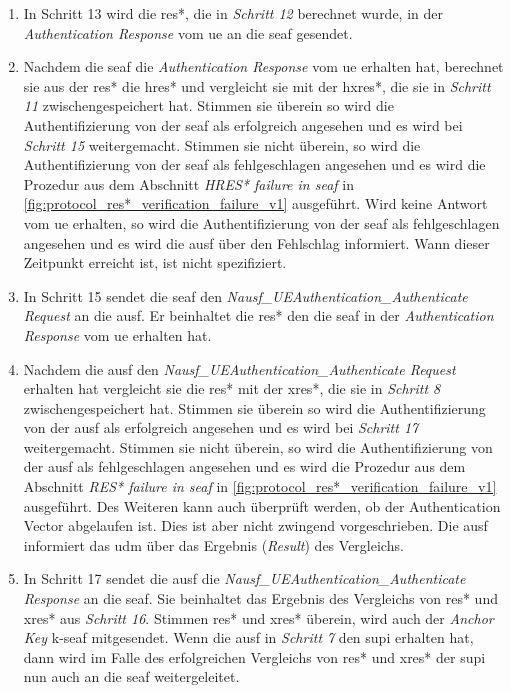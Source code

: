\begin{enumerate}
\item In Schritt 13 wird die \gls{res*}, die in \textit{Schritt 12} berechnet wurde, in der \textit{Authentication Response} vom \gls{ue} an die \gls{seaf} gesendet.

\item Nachdem die \gls{seaf} die \textit{Authentication Response} vom \gls{ue} erhalten hat, berechnet sie aus der \gls{res*} die \gls{hres*} und vergleicht sie mit der \gls{hxres*}, die sie in \textit{Schritt 11} zwischengespeichert hat.
Stimmen sie überein so wird die Authentifizierung von der \gls{seaf} als erfolgreich angesehen und es wird bei \textit{Schritt 15} weitergemacht.
Stimmen sie nicht überein, so wird die Authentifizierung von der \gls{seaf} als fehlgeschlagen angesehen und es wird die Prozedur aus dem Abschnitt \textit{HRES* failure in \gls{seaf}} in \cref{fig:protocol_res*_verification_failure_v1} ausgeführt.
Wird keine Antwort vom \gls{ue} erhalten, so wird die Authentifizierung von der \gls{seaf} als fehlgeschlagen angesehen und es wird die \gls{ausf} über den Fehlschlag informiert.
Wann dieser Zeitpunkt erreicht ist, ist nicht spezifiziert.

\item In Schritt 15 sendet die \gls{seaf} den \textit{Nausf\_UEAuthentication\_Authenticate Request} an die \gls{ausf}.
Er beinhaltet die \gls{res*} den die \gls{seaf} in der \textit{Authentication Response} vom \gls{ue} erhalten hat.

\item Nachdem die \gls{ausf} den \textit{Nausf\_UEAuthentication\_Authenticate Request} erhalten hat vergleicht sie die \gls{res*} mit der \gls{xres*}, die sie in \textit{Schritt 8} zwischengespeichert hat.
Stimmen sie überein so wird die Authentifizierung von der \gls{ausf} als erfolgreich angesehen und es wird bei \textit{Schritt 17} weitergemacht.
Stimmen sie nicht überein, so wird die Authentifizierung von der \gls{ausf} als fehlgeschlagen angesehen und es wird die Prozedur aus dem Abschnitt \textit{RES* failure in \gls{seaf}} in \cref{fig:protocol_res*_verification_failure_v1} ausgeführt.
Des Weiteren kann auch überprüft werden, ob der Authentication Vector abgelaufen ist.
Dies ist aber nicht zwingend vorgeschrieben.
Die \gls{ausf} informiert das \gls{udm} über das Ergebnis (\textit{Result}) des Vergleichs.

\item In Schritt 17 sendet die \gls{ausf} die \textit{Nausf\_UEAuthentication\_Authenticate Response} an die \gls{seaf}.
Sie beinhaltet das Ergebnis des Vergleichs von \gls{res*} und \gls{xres*} aus \textit{Schritt 16}.
Stimmen \gls{res*} und \gls{xres*} überein, wird auch der \textit{Anchor Key} \gls{k-seaf} mitgesendet.
Wenn die \gls{ausf} in \textit{Schritt 7} den \gls{supi} erhalten hat, dann wird im Falle des erfolgreichen Vergleichs von \gls{res*} und \gls{xres*} der \gls{supi} nun auch an die \gls{seaf} weitergeleitet.
\end{enumerate}


